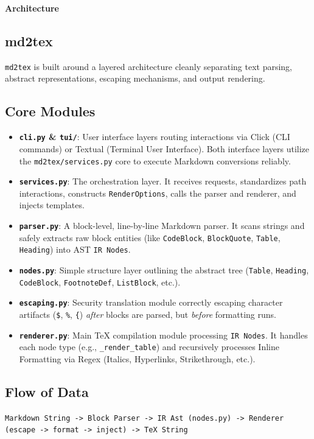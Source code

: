 \documentclass[a4paper, 12pt, twoside]{article}
\begin{document}
\begin{titlepage}
    \vspace*{5cm}
    \begin{center}
        \Huge \textbf{Architecture}
    \end{center}
    \vfill
\end{titlepage}

\tableofcontents
\clearpage

\subsection*{md2tex}

\texttt{md2tex} is built around a layered architecture cleanly separating text parsing, abstract representations, escaping mechanisms, and output rendering.

\subsection*{Core Modules}

\begin{itemize}
    \item \textbf{\texttt{cli.py} \& \texttt{tui/}}: User interface layers routing interactions via Click (CLI commands) or Textual (Terminal User Interface). Both interface layers utilize the \texttt{md2tex/services.py} core to execute Markdown conversions reliably.
    \item \textbf{\texttt{services.py}}: The orchestration layer. It receives requests, standardizes path interactions, constructs \texttt{RenderOptions}, calls the parser and renderer, and injects templates.
    \item \textbf{\texttt{parser.py}}: A block-level, line-by-line Markdown parser. It scans strings and safely extracts raw block entities (like \texttt{CodeBlock}, \texttt{BlockQuote}, \texttt{Table}, \texttt{Heading}) into AST \texttt{IR Nodes}. 
    \item \textbf{\texttt{nodes.py}}: Simple structure layer outlining the abstract tree (\texttt{Table}, \texttt{Heading}, \texttt{CodeBlock}, \texttt{FootnoteDef}, \texttt{ListBlock}, etc.).
    \item \textbf{\texttt{escaping.py}}: Security translation module correctly escaping character artifacts (\texttt{\$}, \texttt{\%}, \texttt{\{}) \textit{after} blocks are parsed, but \textit{before} formatting runs.
    \item \textbf{\texttt{renderer.py}}: Main TeX compilation module processing \texttt{IR Nodes}. It handles each node type (e.g., \texttt{\_render\_table}) and recursively processes Inline Formatting via Regex (Italics, Hyperlinks, Strikethrough, etc.).
\end{itemize}

\subsection*{Flow of Data}

\texttt{Markdown String -> Block Parser -> IR Ast (nodes.py) -> Renderer (escape -> format -> inject) -> TeX String}
\end{document}
